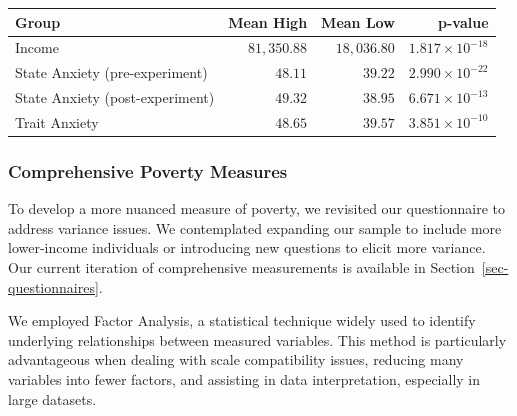 \documentclass[
]{article}
\begin{document}
\begin{table}

\caption{\label{tbl-exp1-demo}Descriptive statistics for income and
anxiety scores}\begin{minipage}[t]{\linewidth}

{\centering 

\begin{longtable}{lrrr}
\tabularnewline

\toprule
Group & Mean High & Mean Low & p-value \\ 
\midrule
Income & $81,350.88$ & $18,036.80$ & $1.817 \times 10^{-18}$ \\ 
State Anxiety (pre-experiment) & $48.11$ & $39.22$ & $2.990 \times 10^{-22}$ \\ 
State Anxiety (post-experiment) & $49.32$ & $38.95$ & $6.671 \times 10^{-13}$ \\ 
Trait Anxiety & $48.65$ & $39.57$ & $3.851 \times 10^{-10}$ \\ 
\bottomrule
\end{longtable}

}

\end{minipage}%

\end{table}

\hypertarget{comprehensive-poverty-measures}{%
\subsubsection{Comprehensive Poverty
Measures}\label{comprehensive-poverty-measures}}

To develop a more nuanced measure of poverty, we revisited our
questionnaire to address variance issues. We contemplated expanding our
sample to include more lower-income individuals or introducing new
questions to elicit more variance. Our current iteration of
comprehensive measurements is available in
Section~\ref{sec-questionnaires}.

We employed Factor Analysis, a statistical technique widely used to
identify underlying relationships between measured variables. This
method is particularly advantageous when dealing with scale
compatibility issues, reducing many variables into fewer factors, and
assisting in data interpretation, especially in large datasets.
\end{document}

